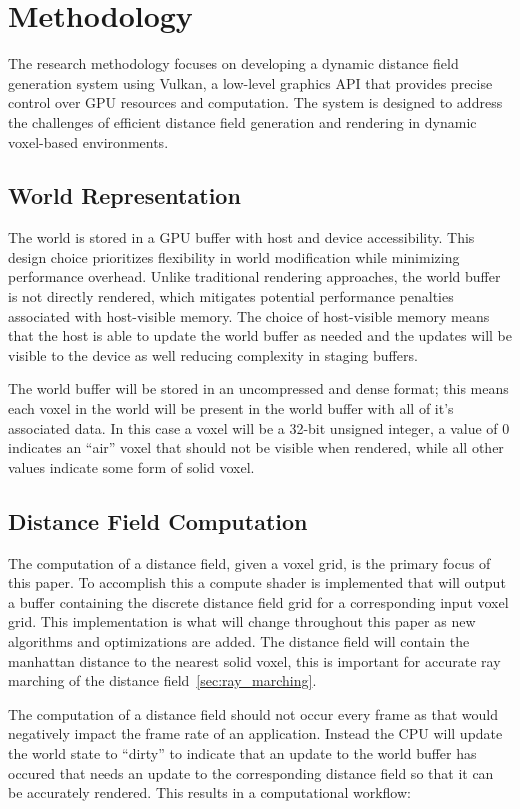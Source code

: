 \chapter{Methodology}
The research methodology focuses on developing a dynamic distance field generation system using Vulkan, a low-level
graphics API that provides precise control over GPU resources and computation. The system is designed to address the
challenges of efficient distance field generation and rendering in dynamic voxel-based environments.

\section{World Representation}
The world is stored in a GPU buffer with host and device accessibility. This design choice prioritizes flexibility in
world modification while minimizing performance overhead. Unlike traditional rendering approaches, the world buffer is
not directly rendered, which mitigates potential performance penalties associated with host-visible memory. The choice
of host-visible memory means that the host is able to update the world buffer as needed and the updates will be visible
to the device as well reducing complexity in staging buffers.

The world buffer will be stored in an uncompressed and dense format; this means each voxel in the world will be
present in the world buffer with all of it's associated data. In this case a voxel will be a 32-bit unsigned integer, a
value of 0 indicates an ``air'' voxel that should not be visible when rendered, while all other values indicate some
form of solid voxel.

\section{Distance Field Computation}
The computation of a distance field, given a voxel grid, is the primary focus of this paper. To accomplish this a
compute shader is implemented that will output a buffer containing the discrete distance field grid for a corresponding
input voxel grid. This implementation is what will change throughout this paper as new algorithms and optimizations are
added. The distance field will contain the manhattan distance to the nearest solid voxel, this is important for accurate
ray marching of the distance field~\ref{sec:ray_marching}.

The computation of a distance field should not occur every frame as that would negatively impact the frame rate of an
application. Instead the CPU will update the world state to ``dirty'' to indicate that an update to the world buffer has
occured that needs an update to the corresponding distance field so that it can be accurately rendered. This results in
a computational workflow:

